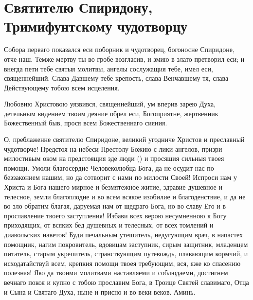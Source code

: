 \mychapterending


 
\section{Святителю Спиридону, Тримифунтскому чудотворцу}\begin{mymulticols}
 


Собора перваго показался еси поборник и чудотворец, богоносне Спиридоне, отче наш. Темже мертву ты во гробе возгласив, и змию в злато претворил еси; и внегда пети тебе святыя молитвы, ангелы сослужащия тебе, имел еси, священнейший. Слава Давшему тебе крепость, слава Венчавшему тя, слава Действующему тобою всем исцеления.


Любовию Христовою уязвився, священнейший, ум вперив зарею Духа, детельным видением твоим деяние обрел еси, Богоприятне, жертвенник Божественный быв, прося всем Божественнаго сияния.


О, преблаженне святителю Спиридоне, великий угодниче Христов и преславный чудотворче! Предстоя на небеси Престолу Божию с лики ангелов, призри милостивым оком на предстоящия зде люди () и просящия сильныя твоея помощи. Умоли благосердие Человеколюбца Бога, да не осудит нас по беззаконием нашим, но да сотворит с нами по милости Своей! Испроси нам у Христа и Бога нашего мирное и безмятежное житие, здравие душевное и телесное, земли благоплодие и во всем всякое изобилие и благоденствие, и да не во зло обратим благая, даруемая нам от щедраго Бога, но во славу Его и в прославление твоего заступления! Избави всех верою несумненною к Богу приходящих, от всяких бед душевных и телесных, от всех томлений и диавольских наветов! Буди печальным утешитель, недугующим врач, в напастех помощник, нагим покровитель, вдовицам заступник, сирым защитник, младенцем питатель, старым укрепитель, странствующим путевождь, плавающим кормчий, и исходатайствуй всем, крепкия помощи твоея требующим, вся, яже ко спасению полезная! Яко да твоими молитвами наставляеми и соблюдаеми, достигнем вечнаго покоя и купно с тобою прославим Бога, в Троице Святей славимаго, Отца и Сына и Святаго Духа, ныне и присно и во веки веков. Аминь.

\end{mymulticols}\newpage


